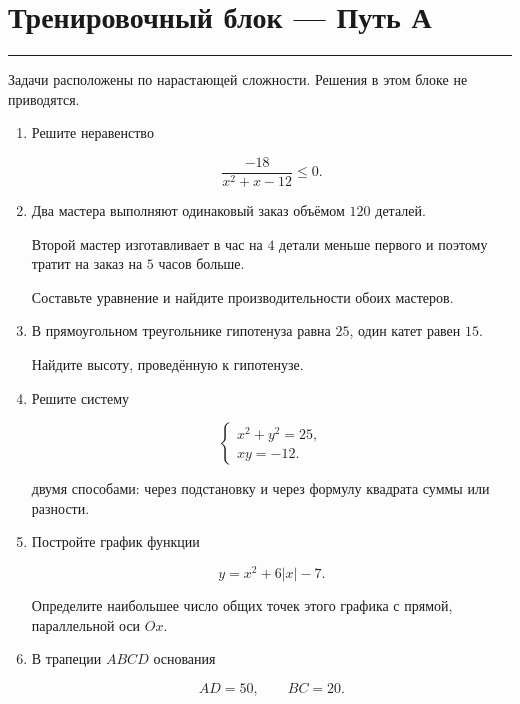 \documentclass[a4paper,12pt]{article}
\newcommand{\topicline}{
    \textcolor{accent}{\rule{\linewidth}{0.6pt}}
}
\begin{document}

\clearpage

\section*{Тренировочный блок --- Путь А}
\topicline

Задачи расположены по нарастающей сложности.
Решения в этом блоке не приводятся.

\begin{enumerate}[label=\textbf{\arabic*.}]

    \item
    Решите неравенство

    \[
    \frac{-18}{x^2+x-12}\le0.
    \]

    \item
    Два мастера выполняют одинаковый заказ
    объёмом $120$ деталей.

    Второй мастер изготавливает в час
    на $4$ детали меньше первого
    и поэтому тратит на заказ
    на $5$ часов больше.

    Составьте уравнение
    и найдите производительности обоих мастеров.

    \item
    В прямоугольном треугольнике
    гипотенуза равна $25$,
    один катет равен $15$.

    Найдите высоту,
    проведённую к гипотенузе.

    \item
    Решите систему

    \[
    \begin{cases}
    x^2+y^2=25,\\
    xy=-12.
    \end{cases}
    \]

    двумя способами:
    через подстановку
    и через формулу квадрата суммы или разности.

    \item
    Постройте график функции

    \[
    y=x^2+6|x|-7.
    \]

    Определите наибольшее число общих точек
    этого графика с прямой,
    параллельной оси $Ox$.

    \item
    В трапеции $ABCD$ основания

    \[
    AD=50,
    \qquad
    BC=20.
    \]


\end{enumerate}
\end{document}
